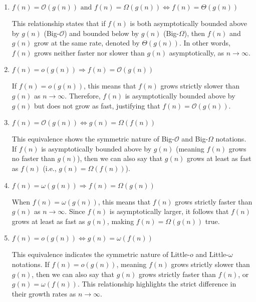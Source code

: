 \begin{enumerate}
    \item \( f(n) = \mathcal{O}(g(n)) \text{ and } f(n) = \Omega(g(n)) \Leftrightarrow f(n) = \Theta(g(n)) \)
    
    This relationship states that if \( f(n) \) is both asymptotically bounded above by \( g(n) \) (Big-\(\mathcal{O}\)) and bounded below by \( g(n) \) (Big-\(\Omega\)), then \( f(n) \) and \( g(n) \) grow at the same rate, denoted by \( \Theta(g(n)) \). In other words, \( f(n) \) grows neither faster nor slower than \( g(n) \) asymptotically, as \( n \to \infty \). \medskip

    \item \( f(n) = o(g(n)) \Rightarrow f(n) = \mathcal{O}(g(n)) \)
    
    If \( f(n) = o(g(n)) \), this means that \( f(n) \) grows strictly slower than \( g(n) \) as \( n \to \infty \). Therefore, \( f(n) \) is asymptotically bounded above by \( g(n) \) but does not grow as fast, justifying that \( f(n) = \mathcal{O}(g(n)) \).\medskip

    \item \( f(n) = \mathcal{O}(g(n)) \Leftrightarrow g(n) = \Omega(f(n)) \)
    
    This equivalence shows the symmetric nature of Big-\(\mathcal{O}\) and Big-\(\Omega\) notations. If \( f(n) \) is asymptotically bounded above by \( g(n) \) (meaning \( f(n) \) grows no faster than \( g(n) \)), then we can also say that \( g(n) \) grows at least as fast as \( f(n) \) (i.e., \( g(n) = \Omega(f(n)) \)). \medskip

    \item \( f(n) = \omega(g(n)) \Rightarrow f(n) = \Omega(g(n)) \)
    
    When \( f(n) = \omega(g(n)) \), this means that \( f(n) \) grows strictly faster than \( g(n) \) as \( n \to \infty \). Since \( f(n) \) is asymptotically larger, it follows that \( f(n) \) grows at least as fast as \( g(n) \), making \( f(n) = \Omega(g(n)) \) true. \medskip

    \item \( f(n) = o(g(n)) \Leftrightarrow g(n) = \omega(f(n)) \)
    
    This equivalence indicates the symmetric nature of Little-\(o\) and Little-\(\omega\) notations. If \( f(n) = o(g(n)) \), meaning \( f(n) \) grows strictly slower than \( g(n) \), then we can also say that \( g(n) \) grows strictly faster than \( f(n) \), or \( g(n) = \omega(f(n)) \). This relationship highlights the strict difference in their growth rates as \( n \to \infty \).
\end{enumerate}

